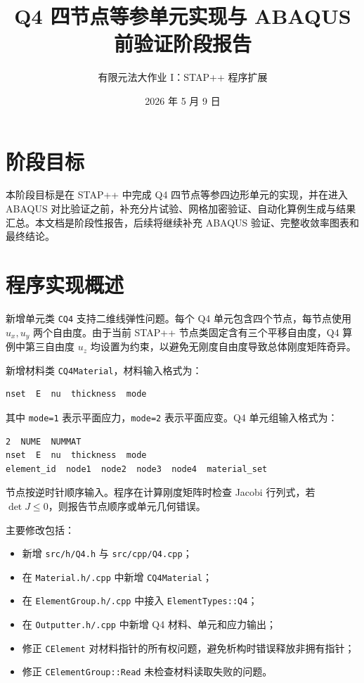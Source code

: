 ﻿\documentclass[UTF8,11pt,a4paper]{ctexart}
\title{Q4 四节点等参单元实现与 ABAQUS 前验证阶段报告}
\author{有限元法大作业 I：STAP++ 程序扩展}
\date{2026 年 5 月 9 日}
\begin{document}
\maketitle

\section{阶段目标}
本阶段目标是在 STAP++ 中完成 Q4 四节点等参四边形单元的实现，并在进入 ABAQUS 对比验证之前，补充分片试验、网格加密验证、自动化算例生成与结果汇总。本文档是阶段性报告，后续将继续补充 ABAQUS 验证、完整收敛率图表和最终结论。

\section{程序实现概述}
新增单元类 \texttt{CQ4} 支持二维线弹性问题。每个 Q4 单元包含四个节点，每节点使用 $u_x,u_y$ 两个自由度。由于当前 STAP++ 节点类固定含有三个平移自由度，Q4 算例中第三自由度 $u_z$ 均设置为约束，以避免无刚度自由度导致总体刚度矩阵奇异。

新增材料类 \texttt{CQ4Material}，材料输入格式为：
\begin{lstlisting}
nset  E  nu  thickness  mode
\end{lstlisting}
其中 \texttt{mode=1} 表示平面应力，\texttt{mode=2} 表示平面应变。Q4 单元组输入格式为：
\begin{lstlisting}
2  NUME  NUMMAT
nset  E  nu  thickness  mode
element_id  node1  node2  node3  node4  material_set
\end{lstlisting}
节点按逆时针顺序输入。程序在计算刚度矩阵时检查 Jacobi 行列式，若 $\det J\le 0$，则报告节点顺序或单元几何错误。

主要修改包括：
\begin{itemize}
  \item 新增 \texttt{src/h/Q4.h} 与 \texttt{src/cpp/Q4.cpp}；
  \item 在 \texttt{Material.h/.cpp} 中新增 \texttt{CQ4Material}；
  \item 在 \texttt{ElementGroup.h/.cpp} 中接入 \texttt{ElementTypes::Q4}；
  \item 在 \texttt{Outputter.h/.cpp} 中新增 Q4 材料、单元和应力输出；
  \item 修正 \texttt{CElement} 对材料指针的所有权问题，避免析构时错误释放非拥有指针；
  \item 修正 \texttt{CElementGroup::Read} 未检查材料读取失败的问题。
\end{itemize}
\end{document}
